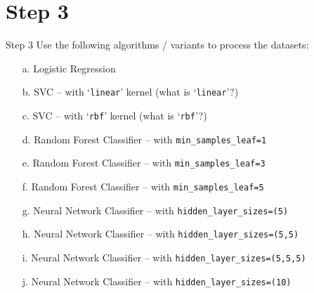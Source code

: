 \section*{Step 3}

\begin{custombox}[label={box:Q3}]{Step 3}
	Use the following algorithms / variants to process the datasets:
    \begin{enumerate}[label=\alph*)]
        \item[a.] Logistic Regression
        \item[b.] SVC – with `\texttt{linear}' kernel (what is `\texttt{linear}'?)
        \item[c.] SVC – with `\texttt{rbf}’ kernel (what is `\texttt{rbf}'?)
        \item[d.] Random Forest Classifier – with \texttt{min\_samples\_leaf=1}
        \item[e.] Random Forest Classifier – with \texttt{min\_samples\_leaf=3}
        \item[f.] Random Forest Classifier – with \texttt{min\_samples\_leaf=5}
        \item[g.] Neural Network Classifier – with \texttt{hidden\_layer\_sizes=(5)}
        \item[h.] Neural Network Classifier – with \texttt{hidden\_layer\_sizes=(5,5)}
        \item[i.] Neural Network Classifier – with \texttt{hidden\_layer\_sizes=(5,5,5)}
        \item[j.] Neural Network Classifier – with \texttt{hidden\_layer\_sizes=(10)}
    \end{enumerate}
\end{custombox}





